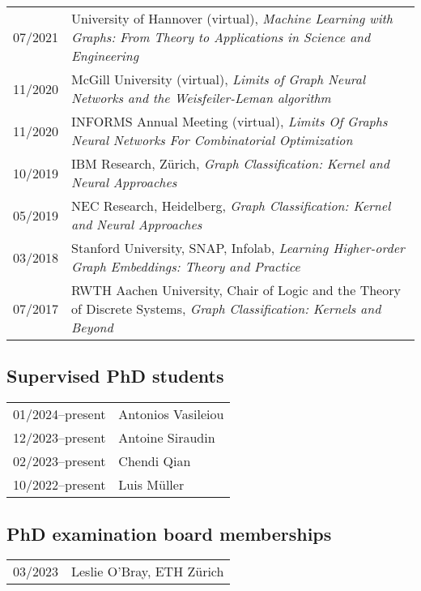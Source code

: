 \documentclass[11pt, a4paper, DIV=14, headings=small]{scrartcl}
\begin{document}
\begin{longtabu}{p{2.1cm}p{12.0cm}}
		07/2021 & University of Hannover (virtual), \emph{Machine Learning with Graphs:
			From Theory to Applications in Science and Engineering}                                                                              \\
		11/2020 & McGill University (virtual), \emph{Limits of Graph Neural Networks and the Weisfeiler-Leman algorithm}                     \\
		11/2020 & INFORMS Annual Meeting (virtual), \emph{Limits Of Graphs Neural Networks For Combinatorial Optimization}                   \\
		10/2019 & IBM Research, Zürich, \emph{Graph Classification: Kernel and Neural Approaches}                                            \\
		05/2019 & NEC Research, Heidelberg, \emph{Graph Classification: Kernel and Neural Approaches}                                        \\
		03/2018 & Stanford University, SNAP, Infolab, \emph{Learning Higher-order Graph Embeddings: Theory and Practice}                     \\
		07/2017 & RWTH Aachen University, Chair of Logic and the Theory of Discrete Systems, \emph{Graph Classification: Kernels and Beyond} \\
	\end{longtabu}
	
	\subsection*{Supervised PhD students}
	\begin{longtabu}{p{2.1cm}p{12.0cm}}
		01/2024--present & Antonios Vasileiou \\
		12/2023--present & Antoine Siraudin \\
		02/2023--present & Chendi Qian \\
		10/2022--present & Luis Müller \\
	\end{longtabu}
	
	\subsection*{PhD examination board memberships}
	\begin{longtabu}{p{2.1cm}p{12.0cm}}
		03/2023 &  Leslie O'Bray, ETH Zürich \\
	\end{longtabu}
	
\end{document}
